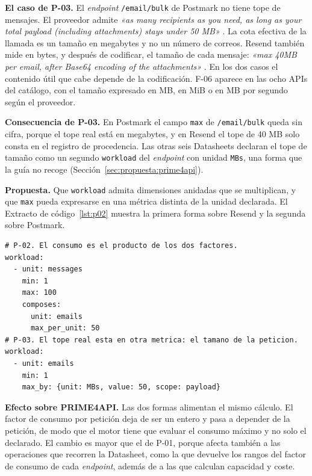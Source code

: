 \textbf{El caso de P-03.} El \textit{endpoint} \texttt{/email/bulk} de Postmark no tiene tope de mensajes.
El proveedor admite \textit{«as many recipients as you need, as long as your total payload (including attachments) stays under 50 MB»} \citep{postmarkapi}.
La cota efectiva de la llamada es un tamaño en megabytes y no un número de correos.
Resend también mide en bytes, y después de codificar, el tamaño de cada mensaje: \textit{«max 40MB per email, after Base64 encoding of the attachments»} \citep{resenddocs}.
En los dos casos el contenido útil que cabe depende de la codificación.
F-06 aparece en las ocho APIs del catálogo, con el tamaño expresado en MB, en MiB o en MB por segundo según el proveedor.

\textbf{Consecuencia de P-03.} En Postmark el campo \texttt{max} de \texttt{/email/bulk} queda sin cifra, porque el tope real está en megabytes, y en Resend el tope de 40 MB solo consta en el registro de procedencia.
Las otras seis Datasheets declaran el tope de tamaño como un segundo \texttt{workload} del \textit{endpoint} con unidad \texttt{MBs}, una forma que la guía no recoge (Sección~\ref{sec:propuesta:prime4api}).

\textbf{Propuesta.} Que \texttt{workload} admita dimensiones anidadas que se multiplican, y que \texttt{max} pueda expresarse en una métrica distinta de la unidad declarada.
El Extracto de código~\ref{lst:p02} muestra la primera forma sobre Resend y la segunda sobre Postmark.

\begin{lstlisting}[style=datasheetyaml,caption={P-02 y P-03: composición de dimensiones anidadas y cota expresada en otra métrica (caso Resend para P-02 y caso Postmark para P-03).},label={lst:p02}]
# P-02. El consumo es el producto de los dos factores.
workload:
  - unit: messages
    min: 1
    max: 100
    composes:
      unit: emails
      max_per_unit: 50
# P-03. El tope real esta en otra metrica: el tamano de la peticion.
workload:
  - unit: emails
    min: 1
    max_by: {unit: MBs, value: 50, scope: payload}
\end{lstlisting}

\textbf{Efecto sobre PRIME4API.} Las dos formas alimentan el mismo cálculo.
El factor de consumo por petición deja de ser un entero y pasa a depender de la petición, de modo que el motor tiene que evaluar el consumo máximo y no solo el declarado.
El cambio es mayor que el de P-01, porque afecta también a las operaciones que recorren la Datasheet, como la que devuelve los rangos del factor de consumo de cada \textit{endpoint}, además de a las que calculan capacidad y coste.

